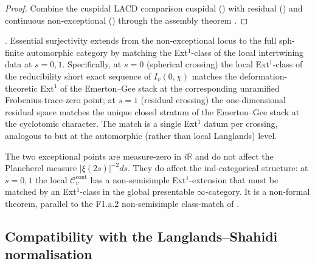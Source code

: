 \begin{proof}
Combine the cuspidal LACD comparison cuspidal
() with residual
() and continuous non-exceptional
() through the assembly theorem
.
\end{proof}

\begin{conjecture}
\label{v4-arith:w6-d:conj:exceptional-unitary-crossing}
\ClaimStatusConjectured. Essential surjectivity extends from the
non-exceptional locus to the full sph-finite automorphic category
by matching the Ext\({}^{1}\)-class of the local intertwining
data at \(s=0,1\). Specifically, at \(s=0\) (spherical crossing) the
local Ext\({}^{1}\)-class of the reducibility short exact sequence
of \(I_{v}(0,\chi)\) matches the deformation-theoretic Ext\({}^{1}\)
of the Emerton--Gee stack at the corresponding unramified
Frobenius-trace-zero point; at \(s=1\) (residual crossing) the
one-dimensional residual space matches the unique closed stratum
of the Emerton--Gee stack at the cyclotomic character. The match
is a single Ext\({}^{1}\) datum per crossing, analogous to
 but at the
automorphic (rather than local Langlands) level.
\end{conjecture}

\begin{remark}
\label{v4-arith:w6-d:rem:exceptional-domain}
The two exceptional points are measure-zero in \(i\mathbb{R}\) and
do not affect the Plancherel measure \(|\xi(2s)|^{-2}ds\). They do
affect the ind-categorical structure: at \(s=0,1\) the local
\(\mathcal{C}^{\mathrm{cont}}_{v}\) has a non-semisimple
Ext\({}^{1}\)-extension that must be matched by an
Ext\({}^{1}\)-class in the global presentable \(\infty\)-category.
It is a non-formal theorem, parallel to the F1.a.2 non-semisimple
class-match of .
\end{remark}

\subsection{Compatibility with the Langlands--Shahidi normalisation}

